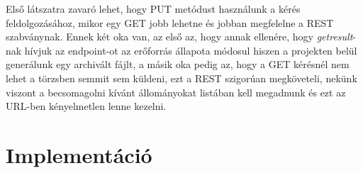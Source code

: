 Első látszatra zavaró lehet, hogy PUT metódust használunk a kérés feldolgozásához, mikor egy GET jobb lehetne és jobban megfelelne a REST szabványnak. Ennek két oka van, az első az, hogy annak ellenére, hogy \textit{getresult}-nak hívjuk az endpoint-ot az erőforrás állapota módosul hiszen a projekten belül generálunk egy archivált fájlt, a másik oka pedig az, hogy a GET kérésnél nem lehet a törzsben semmit sem küldeni, ezt a REST szigorúan megköveteli, nekünk viszont a becsomagolni kívánt állományokat listában kell megadnunk és ezt az URL-ben kényelmetlen lenne kezelni.


\section{Implementáció}




